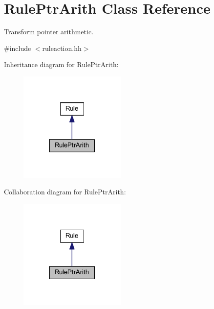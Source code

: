 \hypertarget{class_rule_ptr_arith}{}\section{Rule\+Ptr\+Arith Class Reference}
\label{class_rule_ptr_arith}


Transform pointer arithmetic.  




{\ttfamily \#include $<$ruleaction.\+hh$>$}



Inheritance diagram for Rule\+Ptr\+Arith\+:
\nopagebreak
\begin{figure}[H]
\begin{center}
\leavevmode
\includegraphics[width=149pt]{class_rule_ptr_arith__inherit__graph}
\end{center}
\end{figure}


Collaboration diagram for Rule\+Ptr\+Arith\+:
\nopagebreak
\begin{figure}[H]
\begin{center}
\leavevmode
\includegraphics[width=149pt]{class_rule_ptr_arith__coll__graph}
\end{center}
\end{figure}
